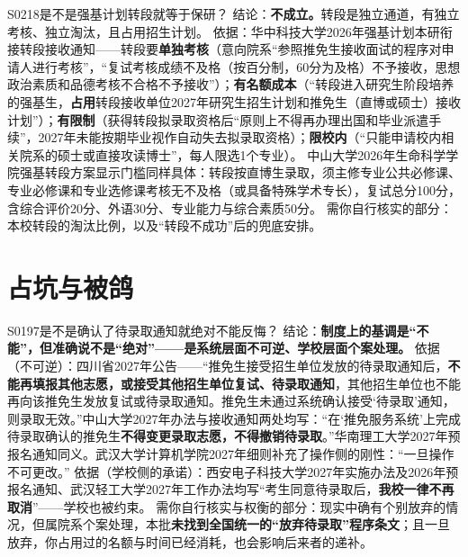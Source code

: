 \begin{qa}{S0218}{是不是强基计划转段就等于保研？}
结论：\textbf{不成立。}转段是独立通道，有独立考核、独立淘汰，且占用招生计划。
依据：华中科技大学2026年强基计划本研衔接转段接收通知——转段要\textbf{单独考核}（意向院系“参照推免生接收面试的程序对申请人进行考核”，“复试考核成绩不及格（按百分制，60分为及格）不予接收，思想政治素质和品德考核不合格不予接收”）；\textbf{有名额成本}（“转段进入研究生阶段培养的强基生，\textbf{占用}转段接收单位2027年研究生招生计划和推免生（直博或硕士）接收计划”）；\textbf{有限制}（获得转段拟录取资格后“原则上不得再办理出国和毕业派遣手续”，2027年未能按期毕业视作自动失去拟录取资格）；\textbf{限校内}（“只能申请校内相关院系的硕士或直接攻读博士”，每人限选1个专业）。
中山大学2026年生命科学学院强基转段方案显示门槛同样具体：转段按直博生录取，须主修专业公共必修课、专业必修课和专业选修课考核无不及格（或具备特殊学术专长），复试总分100分，含综合评价20分、外语30分、专业能力与综合素质50分。
需你自行核实的部分：本校转段的淘汰比例，以及“转段不成功”后的兜底安排。
\end{qa}

\section{占坑与被鸽}
\begin{qa}{S0197}{是不是确认了待录取通知就绝对不能反悔？}
结论：\textbf{制度上的基调是“不能”，但准确说不是“绝对”——是系统层面不可逆、学校层面个案处理。}
依据（不可逆）：四川省2027年公告——“推免生接受招生单位发放的待录取通知后，\textbf{不能再填报其他志愿，或接受其他招生单位复试、待录取通知}，其他招生单位也不能再向该推免生发放复试或待录取通知。推免生未通过系统确认接受‘待录取’通知，则录取无效。”中山大学2027年办法与接收通知两处均写：“在‘推免服务系统’上完成待录取确认的推免生\textbf{不得变更录取志愿，不得撤销待录取}。”华南理工大学2027年预报名通知同义。武汉大学计算机学院2027年细则补充了操作侧的刚性：“一旦操作不可更改。”
依据（学校侧的承诺）：西安电子科技大学2027年实施办法及2026年预报名通知、武汉轻工大学2027年工作办法均写“考生同意待录取后，\textbf{我校一律不再取消}”——学校也被约束。
需你自行核实与权衡的部分：现实中确有个别放弃的情况，但属院系个案处理，本批\textbf{未找到全国统一的“放弃待录取”程序条文}；且一旦放弃，你占用过的名额与时间已经消耗，也会影响后来者的递补。
\end{qa}

